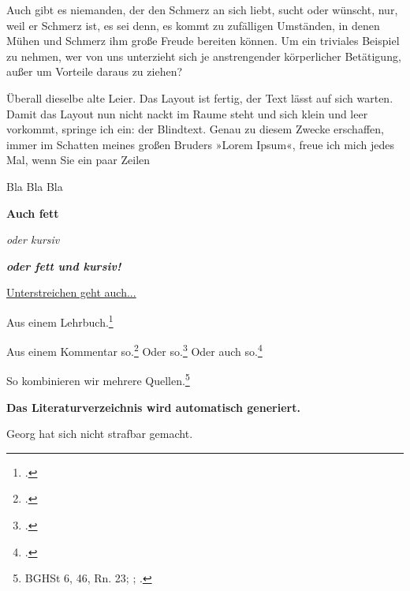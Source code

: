 \documentclass{jura}
\begin{document}
	
	Auch gibt es niemanden, der den Schmerz an sich liebt, sucht oder wünscht, nur, weil er Schmerz ist, es sei denn, es kommt zu zufälligen Umständen, in denen Mühen und Schmerz ihm große Freude bereiten können. Um ein triviales Beispiel zu nehmen, wer von uns unterzieht sich je anstrengender körperlicher Betätigung, außer um Vorteile daraus zu ziehen? 
	
	
	
	Überall dieselbe alte Leier. Das Layout ist fertig, der Text lässt auf sich warten. Damit das Layout nun nicht nackt im Raume steht und sich klein und leer vorkommt, springe ich ein: der Blindtext. Genau zu diesem Zwecke erschaffen, immer im Schatten meines großen Bruders »Lorem Ipsum«, freue ich mich jedes Mal, wenn Sie ein paar Zeilen 
	
	
	
	Bla Bla Bla
	
	\textbf{Auch fett}
	
	\textit{oder kursiv}
	
	\textit{\textbf{oder fett und kursiv!}}
	
	\underline{Unterstreichen geht auch...}
	
	\levelup
	
	\levelup
	
	\levelup
	\levelup
	
	Aus einem Lehrbuch.\footcite[\S~14~Rn.~6]{rengier}
	
	Aus einem Kommentar so.\footcite[Sternberg-Lieben/Schuster][\S~15~Rn.~68]{schoenkeschroeder} Oder so.\footcite[Freund][]{mueko} Oder auch so.\footcite[Bosch][]{schoenkeschroeder}
	
	So kombinieren wir mehrere Quellen.\footnote{BGHSt 6, 46, Rn. 23; \cite[Heuchemer][\S~13~Rn.~91]{beckOKStGB}; \cite[236]{esser}.}
	
	\textbf{Das Literaturverzeichnis wird automatisch generiert.}
	
	\levelup
	
	Georg hat sich nicht strafbar gemacht.
	
	\newpage
	
\end{document}
